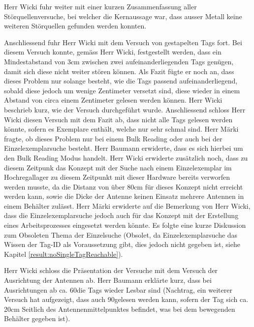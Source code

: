 \documentclass[parskip=full, a4paper]{scrreprt}
\begin{document}
Herr Wicki fuhr weiter mit einer kurzen Zusammenfassung aller Störquellenversuche, bei welcher die Kernaussage war, dass ausser Metall keine weiteren Störquellen gefunden werden konnten.

Anschliessend fuhr Herr Wicki mit dem Versuch von gestapelten Tags fort. Bei diesem Versuch konnte, gemäss Herr Wicki, festgestellt werden, dass ein Mindestabstand von 3cm zwischen zwei aufeinanderliegenden Tags genügen, damit sich diese nicht weiter stören können. Als Fazit fügte er noch an, dass dieses Problem nur solange besteht, wie die Tags passend aufeinanderliegend, sobald diese jedoch um wenige Zentimeter versetzt sind, diese wieder in einem Abstand von circa einem Zentimeter gelesen werden können.
Herr Wicki beschrieb kurz, wie der Versuch durchgeführt wurde. Anschliessend schloss Herr Wicki diesen Versuch mit dem Fazit ab, dass nicht alle Tags gelesen werden könnte, sofern es Exemplare enthält, welche nur sehr schmal sind.
Herr Märki fragte, ob dieses Problem nur bei einem Bulk Reading oder auch bei der Einzelexemplarsuche besteht. Herr Baumann erwiderte, dass es sich hierbei um den Bulk Reading Modus handelt. Herr Wicki erwiderte zusätzlich noch, dass zu diesem Zeitpunk das Konzept mit der Suche nach einem Einzelexemplar im Hochregallager zu diesem Zeitpunkt mit dieser Hardware bereits verworfen werden musste, da die Distanz von über 80cm für dieses Konzept nicht erreicht werden kann, sowie die Dicke der Antenne keinen Einsatz mehrere Antennen in einem Behälter zulässt.
Herr Märki erwiderte auf die Bemerkung von Herr Wicki, dass die Einzelexemplarsuche jedoch auch für das Konzept mit der Erstellung eines Arbeitsprozesses eingesetzt werden könnte.
Es folgte eine kurze Diskussion zum Obsoleten Thema der Einzelsuche (Obsolet, da Einzelexemplarsuche das Wissen der Tag-ID als Voraussetzung gibt, dies jedoch nicht gegeben ist, siehe Kapitel \ref{result:noSingleTagReachable}).

Herr Wicki schloss die Präsentation der Versuche mit dem Versuch der Ausrichtung der Antennen ab. Herr Baumann erklärte kurz, dass bei Ausrichtungen ab ca. 60\SIUnitSymbolDegree die Tags wieder Lesbar sind (Nachtrag, ein weiterer Versuch hat aufgezeigt, dass auch 90\SIUnitSymbolDegree gelesen werden kann, sofern der Tag sich ca. 20cm Seitlich des Antennenmittelpunktes befindet, was bei dem bewegenden Behälter gegeben ist).
\end{document}

